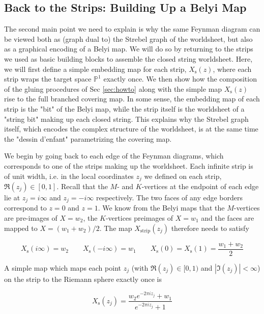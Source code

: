 \documentclass[english]{article}
\renewcommand{\>}{\rangle}
\newcommand{\<}{\langle}
\renewcommand{\(}{\left(}
\renewcommand{\)}{\right)}
\begin{document}
\subsection{Back to the Strips: Building Up a Belyi Map} \label{sec:backtostrips}
The second main point we need to explain is why the same Feynman diagram can be viewed both as (graph dual to) the Strebel graph of the worldsheet, but also as a graphical encoding of a Belyi map. We will do so by returning to the strips we used as basic building blocks to assemble the closed string worldsheet. Here, we will first define a simple embedding map for each strip, $X_{\text{s}}(z)$, where each strip wraps the target space $\mathbb{P}^1$ exactly once. We then show how the composition of the gluing procedures of Sec \ref{sec:howto} along with the simple map $X_{\text{s}}(z)$ rise to the full branched covering map. In some sense, the embedding map of each strip is the "bit" of the Belyi map, while the strip itself is the worldsheet of a "string bit" making up each closed string. This explains why the Strebel graph itself, which encodes the complex structure of the worldsheet, is at the same time the  "dessin d'enfant" parametrizing the covering map. 

We begin by going back to each edge of the Feynman diagrams, which corresponds to one of the strips making up the worldsheet. Each infinite strip is of unit width, i.e. in the local coordinates $z_{j}$ we defined on each strip, $\Re(z_{j})\in [0,1]$. Recall that the $M$- and $K$-vertices at the endpoint of each edge lie at $z_{j}=i \infty$ and $z_{j}=-i\infty$ respectively. The two faces of any edge borders correspond to $z=0$ and $z=1$. We know from the Belyi maps that the $M$-vertices are pre-images of $X=w_2$, the $K$-vertices preimages of $X=w_1$ and the faces are mapped to $X=(w_1+w_2)/2$. The map $X_{\text{strip}}(z_j)$ therefore needs to satisfy

\begin{equation}
    X_{\text{s}}(i\infty) = w_2 \qquad   X_{\text{s}}(-i\infty)=w_1 \qquad   X_{\text{s}}(0)=X_{\text{s}}(1)=\frac{w_1+w_2}{2}
\end{equation}

A simple map which maps each point $z_{j}$ (with $\Re(z_{j}) \in [0,1)$ and $|\Im(z_{j})|<\infty$) on the strip to the Riemann sphere exactly once is

\begin{equation} \label{eq:Xstrip}
     X_{\text{s}}(z_{j})=\frac{w_{2} e^{-2\pi i z_{j}}+w_1}{e^{-2\pi i z_{j}}+1}
\end{equation}
\end{document}
